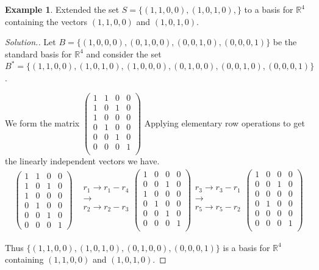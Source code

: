 \documentclass[11pt,a4paper]{article}
\theoremstyle{definition}
\newtheorem{exa}[thm]{Example}
\newenvironment{solution}
  {\renewcommand{\qedsymbol}{}\begin{proof}[\textit{Solution}.]}
  {\end{proof}}
\begin{document}
\begin{exa}
Extended the set $S=\{(1,1,0,0), (1,0,1,0),\}$ to a basis for $\mathbb{R}^4$ containing the vectors $(1,1,0,0)$ and $(1,0,1,0)$.
\end{exa}
\begin{solution}
Let $B=\{(1,0,0,0), (0,1,0,0), (0,0,1,0), (0,0,0,1)\}$ be the standard basis for $\mathbb{R}^4$ and consider the set $B^*=\{(1,1,0,0), (1,0,1,0), (1,0,0,0), (0,1,0,0), (0,0,1,0), (0,0,0,1)\}$.

We form the matrix
$
\begin{pmatrix}
1&1&0&0\\1&0&1&0\\1&0&0&0\\0&1&0&0\\0&0&1&0\\0&0&0&1\\
\end{pmatrix}
$
Applying elementary row operations to get the linearly independent vectors we have.
\begin{align*}
\begin{pmatrix}
1&1&0&0\\1&0&1&0\\1&0&0&0\\0&1&0&0\\0&0&1&0\\0&0&0&1
\end{pmatrix}
& 
\begin{matrix}
r_1\rightarrow r_1-r_4\\\longrightarrow \\ r_2\rightarrow r_2-r_3\\
\end{matrix}
\begin{pmatrix}
1&0&0&0\\ 0&0&1&0\\1&0&0&0\\0&1&0&0\\0&0&1&0\\0&0&0&1\\
\end{pmatrix}
\begin{matrix}
r_3\rightarrow r_3-r_1\\ \longrightarrow \\ r_5\rightarrow r_5-r_2\\
\end{matrix}
\begin{pmatrix}
1&0&0&0\\0&0&1&0\\0&0&0&0\\0&1&0&0\\0&0&0&0\\0&0&0&1\\
\end{pmatrix}
\end{align*}

Thus $\{(1,1,0,0), (1,0,1,0), (0,1,0,0), (0,0,0,1)\}$ is a basis for $\mathbb{R}^4$ containing $(1,1,0,0)$ and $(1,0,1,0)$.
\end{solution}
\end{document}
